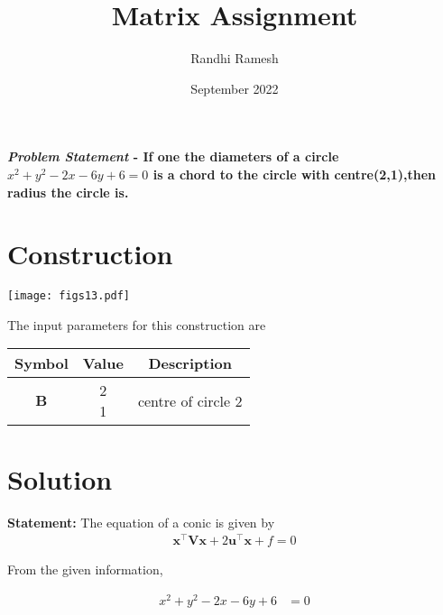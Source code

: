 \documentclass[journal,10pt,twocolumn]{article}
\title{\textbf{Matrix Assignment}}
\author{Randhi Ramesh}
\date{September 2022}
\newcommand{\myvec}[1]{\ensuremath{\begin{pmatrix}#1\end{pmatrix}}}
\numberwithin{equation}{subsection}
\let\vec\mathbf
\begin{document}
\maketitle
\paragraph{\textit{Problem Statement} - If one the diameters of a circle $ x^2 +y^2-2x-6y +6= 0 $ is a chord to the circle with centre(2,1),then radius the circle is.}


\section*{Construction}
 	\begin{center}
  \texttt{[image: figs13.pdf]}
 
 \end{center}
  
    The input parameters for this construction are 
\begin{center}
\begin{tabular}{|c|c|c|}
	\hline
	\textbf{Symbol}&\textbf{Value}&\textbf{Description}\\

	\hline
		$\vec{B}$&\myvec{2\\1}&centre of circle 2\\[8pt]
	\hline
	\end{tabular}
\end{center}
\section*{Solution}
   \textbf{Statement:}
The equation of  a conic is given by 
\begin{align}
    \vec{x}^{\top}\vec{V}\vec{x}+2\vec{u}^{\top}\vec{x}+f=0
    \end{align}
 

		   
		\textbf{} From the given information,

		    \begin{align}
		        x^2 +y^2-2x-6y+6 &= 0
         \end{align}
         
\end{document}
